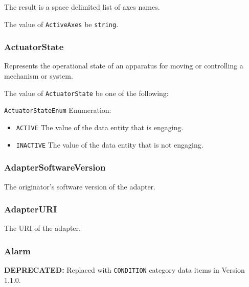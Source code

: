 The result is a space delimited list of axes names.


The value of \texttt{ActiveAxes} \MUST be \texttt{string}.



\subsubsection{ActuatorState}
\label{sec:ActuatorState}



Represents the operational state of an apparatus for moving or controlling a mechanism or system.


The value of \texttt{ActuatorState} \MUST be one of the following: 


\texttt{ActuatorStateEnum} Enumeration:

\begin{itemize}
\item \texttt{ACTIVE} \newline The value of the \gls{data entity} that is engaging. 
\item \texttt{INACTIVE} \newline The value of the \gls{data entity} that is not engaging. 
\end{itemize}



\subsubsection{AdapterSoftwareVersion}
\label{sec:AdapterSoftwareVersion}



The originator’s software version of the \gls{adapter}.



\subsubsection{AdapterURI}
\label{sec:AdapterURI}



The \gls{URI} of the \gls{adapter}.



\subsubsection{Alarm}
\label{sec:Alarm}



\textbf{DEPRECATED:} Replaced with \texttt{CONDITION} category data items in Version 1.1.0.



